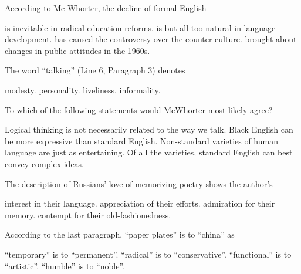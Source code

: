 \item According to Mc Whorter, the decline of formal English
\begin{tasks}
	\task is inevitable in radical education reforms.
	\task is but all too natural in language development.
	\task has caused the controversy over the counter-culture.
	\task brought about changes in public attitudes in the 1960s.
\end{tasks}
\item The word ``talking'' (Line 6, Paragraph 3) denotes
\begin{tasks}
	\task modesty.
	\task personality.
	\task liveliness.
	\task informality.
\end{tasks}
\item To which of the following statements would McWhorter most likely agree?
\begin{tasks}
	\task Logical thinking is not necessarily related to the way we talk.
	\task Black English can be more expressive than standard English.
	\task Non-standard varieties of human language are just as entertaining.
	\task Of all the varieties, standard English can best convey complex ideas.
\end{tasks}
\item The description of Russians' love of memorizing poetry shows the author's
\begin{tasks}
	\task interest in their language.
	\task appreciation of their efforts.
	\task admiration for their memory.
	\task contempt for their old-fashionedness.
\end{tasks}
\item According to the last paragraph, ``paper plates'' is to ``china'' as
\begin{tasks}
	\task ``temporary'' is to ``permanent''.
	\task ``radical'' is to ``conservative''.
	\task ``functional'' is to ``artistic''.
	\task ``humble'' is to ``noble''.
\end{tasks}